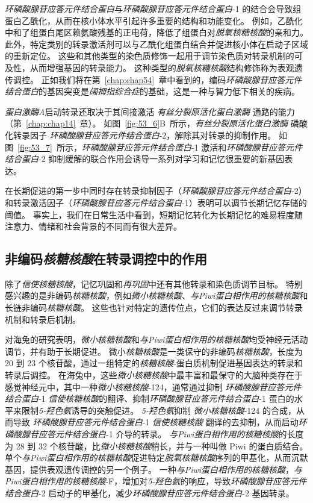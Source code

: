 \textit{环磷酸腺苷应答元件结合蛋白}与\textit{环磷酸腺苷应答元件结合蛋白}-1 的结合会导致组蛋白乙酰化，从而在核小体水平引起许多重要的结构和功能变化。
例如，乙酰化中和了组蛋白尾区赖氨酸残基的正电荷，降低了组蛋白对\textit{脱氧核糖核酸}的亲和力。
此外，特定类别的转录激活剂可以与乙酰化组蛋白结合并促进核小体在启动子区域的重新定位。
这些和其他类型的染色质修饰一起用于调节染色质对转录机制的可及性，从而增强基因的转录能力。
这种类型的\textit{脱氧核糖核酸}结构修饰称为表观遗传调控。
正如我们将在第~\ref{chap:chap54}~章中看到的，编码\textit{环磷酸腺苷应答元件结合蛋白}的基因突变是\textit{阔拇指综合症}的基础，这是一种与智力低下相关的疾病。


\textit{蛋白激酶A}启动转录还取决于其间接激活 \textit{有丝分裂原活化蛋白激酶} 通路的能力（第~\ref{chap:chap14}~章）。
如图~\ref{fig:53_6}B~所示，\textit{有丝分裂原活化蛋白激酶} 磷酸化转录因子 \textit{环磷酸腺苷应答元件结合蛋白}-2，解除其对转录的抑制作用。
如图~\ref{fig:53_7}~所示，\textit{环磷酸腺苷应答元件结合蛋白}-1 激活和\textit{环磷酸腺苷应答元件结合蛋白}-2 抑制缓解的联合作用会诱导一系列对学习和记忆很重要的新基因表达。


在长期促进的第一步中同时存在转录抑制因子（\textit{环磷酸腺苷应答元件结合蛋白}-2）和转录激活因子（\textit{环磷酸腺苷应答元件结合蛋白}-1）表明可以调节长期记忆存储的阈值。
事实上，我们在日常生活中看到，短期记忆转化为长期记忆的难易程度随注意力、情绪和社会背景的不同而有很大差异。



\subsection{非编码\textit{核糖核酸}在转录调控中的作用}

除了\textit{信使核糖核酸}，记忆巩固和\textit{再巩固}中还有其他转录和染色质调节目标。
特别感兴趣的是非编码\textit{核糖核酸}，例如\textit{微小核糖核酸}、\textit{与Piwi蛋白相作用的核糖核酸}和长链非编码\textit{核糖核酸}。
这些也针对特定的遗传位点，它们的表达反过来调节转录机制和转录后机制。


对海兔的研究表明，\textit{微小核糖核酸}和\textit{与Piwi蛋白相作用的核糖核酸}均受神经元活动调节，并有助于长期促进。
微小\textit{核糖核酸}是一类保守的非编码\textit{核糖核酸}，长度为 20 到 23 个核苷酸，通过一组特定的\textit{核糖核酸}-蛋白质机制促进基因表达的转录和转录后调控。
在海兔中，这些\textit{微小核糖核酸}中最丰富和最保守的大脑种类存在于感觉神经元中，其中一种\textit{微小核糖核酸}-124，通常通过抑制 \textit{环磷酸腺苷应答元件结合蛋白}-1 \textit{信使核糖核酸}的翻译、抑制\textit{环磷酸腺苷应答元件结合蛋白}-1 蛋白的水平来限制\textit{5-羟色氨}诱导的突触促进。
\textit{5-羟色氨}抑制 \textit{微小核糖核酸}-124 的合成，从而导致 \textit{环磷酸腺苷应答元件结合蛋白}-1 \textit{信使核糖核酸} 翻译的去抑制，从而启动\textit{环磷酸腺苷应答元件结合蛋白}-1 介导的转录。
\textit{与Piwi蛋白相作用的核糖核酸}的长度为 28 到 32 个核苷酸，比\textit{微小核糖核酸}稍长，并与一种叫做 Piwi 的蛋白质结合。
单个\textit{与Piwi蛋白相作用的核糖核酸}促进特定\textit{脱氧核糖核酸}序列的甲基化，从而沉默基因，提供表观遗传调控的另一个例子。
一种\textit{与Piwi蛋白相作用的核糖核酸}，\textit{与Piwi蛋白相作用的核糖核酸}-F，增加对\textit{5-羟色氨}的响应，导致\textit{环磷酸腺苷应答元件结合蛋白}-2 启动子的甲基化，减少\textit{环磷酸腺苷应答元件结合蛋白}-2 基因转录。


